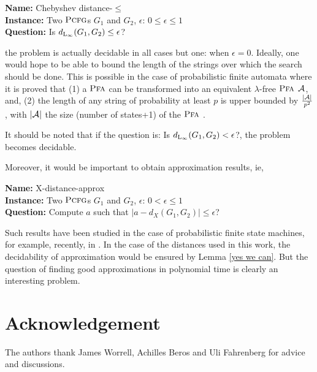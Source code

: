 \documentclass[submission]{eptcs} \usepackage{breakurl}             \usepackage[english]{babel}
\providecommand{\Linf}{\textup{L}\ensuremath{_{\infty}}}
\providecommand{\PCFG}{\ensuremath{\textsc{Pcfg}}}
\providecommand{\A}{\ensuremath{{\cal{A}}}}
\providecommand{\es}{\ensuremath{\lambda}}
\providecommand{\PFA}{\ensuremath{\textsc{Pfa}}}
\begin{document}
\vspace{0.1in}
\noindent\textbf{Name:} Chebyshev distance-$\le$  \\
\textbf{Instance:} Two $\PCFG$s $G_1$ and $G_2$, $\epsilon:\,0\le\epsilon\le 1$\\
\textbf{Question:} Is $d_{\Linf}(G_1,G_2)\le \epsilon$?

\vspace{0.1in}
the problem is actually decidable in all cases but one: when $\epsilon=0$.
Ideally, one would hope to be able to bound the length of the strings over which the search should be done. This is possible in the case of probabilistic finite automata where it is proved that (1) a $\PFA$ can be transformed into an equivalent $\es$-free $\PFA$ $\A$, and, (2) the length of any string of probability at least $p$ is upper bounded by $\frac{|\A|}{p^2}$, with $|\A|$ the size (number of states+1) of the $\PFA$ \cite{higu13b}.

It should be noted that if the question is: Is $d_{\Linf}(G_1,G_2)< \epsilon$?, the problem becomes decidable.

Moreover, it would be important to obtain approximation results, ie,

\vspace{0.1in}
\noindent\textbf{Name:} X-distance-approx  \\
\textbf{Instance:} Two $\PCFG$s $G_1$ and $G_2$, $\epsilon:\,0<\epsilon\le 1$\\
\textbf{Question:} Compute $a$ such that $|a-d_X(G_1,G_2)|\le \epsilon$?

\vspace{0.1in}

Such results have been studied in the case of probabilistic finite state machines, for example, recently, in \cite{chen14}. In the case of the distances used in this work, the decidability of approximation would be ensured by  Lemma \ref{yes we can}. But the question of finding good approximations in polynomial time is clearly an interesting problem.
\section*{Acknowledgement}
The authors thank James Worrell, Achilles Beros and Uli Fahrenberg for advice and discussions.


\end{document}
